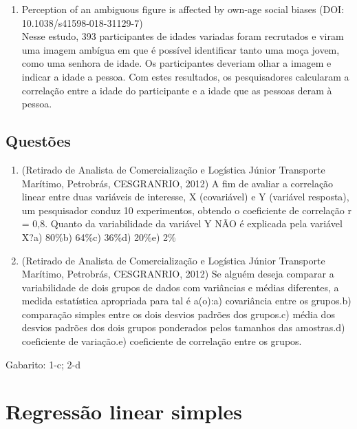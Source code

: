 \documentclass[
]{book}
\providecommand{\tightlist}{%
  \setlength{\itemsep}{0pt}\setlength{\parskip}{0pt}}
\begin{document}
\begin{enumerate}
\def\labelenumi{\arabic{enumi}.}
\tightlist
\item
  Perception of an ambiguous figure is affected by own-age social biases (DOI: 10.1038/s41598-018-31129-7)\\
  Nesse estudo, 393 participantes de idades variadas foram recrutados e viram uma imagem ambígua em que é possível identificar tanto uma moça jovem, como uma senhora de idade. Os participantes deveriam olhar a imagem e indicar a idade a pessoa. Com estes resultados, os pesquisadores calcularam a correlação entre a idade do participante e a idade que as pessoas deram à pessoa.
\end{enumerate}

\hypertarget{questuxf5es-7}{%
\section{Questões}\label{questuxf5es-7}}

\begin{enumerate}
\def\labelenumi{\arabic{enumi}.}
\item
  (Retirado de Analista de Comercialização e Logística Júnior Transporte Marítimo, Petrobrás, CESGRANRIO, 2012) A fim de avaliar a correlação linear entre duas variáveis de interesse, X (covariável) e Y (variável resposta), um pesquisador conduz 10 experimentos, obtendo o coeficiente de correlação r = 0,8. Quanto da variabilidade da variável Y NÃO é explicada pela variável X?a) 80\%b) 64\%c) 36\%d) 20\%e) 2\%
\item
  (Retirado de Analista de Comercialização e Logística Júnior Transporte Marítimo, Petrobrás, CESGRANRIO, 2012) Se alguém deseja comparar a variabilidade de dois grupos de dados com variâncias e médias diferentes, a medida estatística apropriada para tal é a(o):a) covariância entre os grupos.b) comparação simples entre os dois desvios padrões dos grupos.c) média dos desvios padrões dos dois grupos ponderados pelos tamanhos das amostras.d) coeficiente de variação.e) coeficiente de correlação entre os grupos.
\end{enumerate}

Gabarito: 1-c; 2-d

\hypertarget{regressuxe3o-linear-simples}{%
\chapter{Regressão linear simples}\label{regressuxe3o-linear-simples}}
\end{document}
